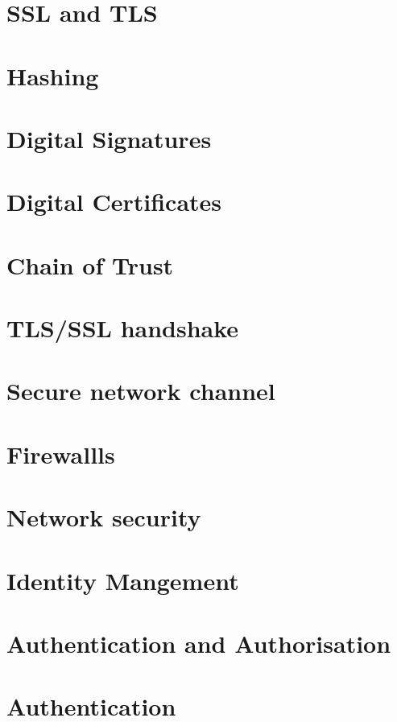 \documentclass[11pt]{article}
\begin{document}
\section{SSL and TLS}

\section{Hashing}

\section{Digital Signatures}

\section{Digital Certificates}

\section{Chain of Trust}

\section{TLS/SSL handshake}

\section{Secure network channel}

\section{Firewallls}

\section{Network security}

\section{Identity Mangement}

\section{Authentication and Authorisation}

\section{Authentication}
\end{document}
